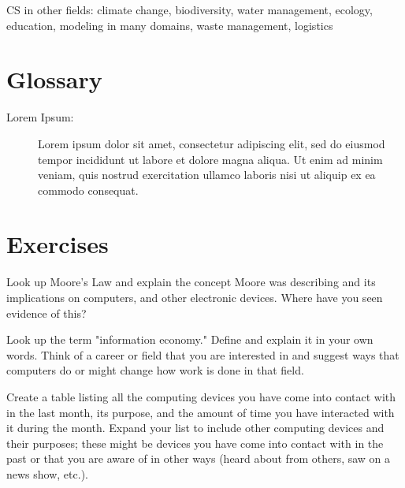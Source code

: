 CS in other fields: climate change, biodiversity, water management, ecology, education, modeling in many domains, waste management, logistics



\section{Glossary}

\begin{description}
	
	\item[Lorem Ipsum:]  Lorem ipsum dolor sit amet, consectetur adipiscing elit, sed do eiusmod tempor incididunt ut labore et dolore magna aliqua. Ut enim ad minim veniam, quis nostrud exercitation ullamco laboris nisi ut aliquip ex ea commodo consequat.
	
\end{description}

\section{Exercises}

\begin{ex}
	Look up Moore's Law and explain the concept Moore was describing and its implications on computers, and other electronic devices. Where have you seen evidence of this?	
\end{ex}
\begin{ex}
	Look up the term "information economy." Define and explain it in your own words. Think of a career or field that you are interested in and suggest ways that computers do or might change how work is done in that field.
\end{ex}
\begin{ex}
	Create a table listing all the computing devices you have come into contact with in the last month, its purpose, and the amount of time you have interacted with it during the month. Expand your list to include other computing devices and their purposes; these might be devices you have come into contact with in the past or that you are aware of in other ways (heard about from others, saw on a news show, etc.).
\end{ex}
